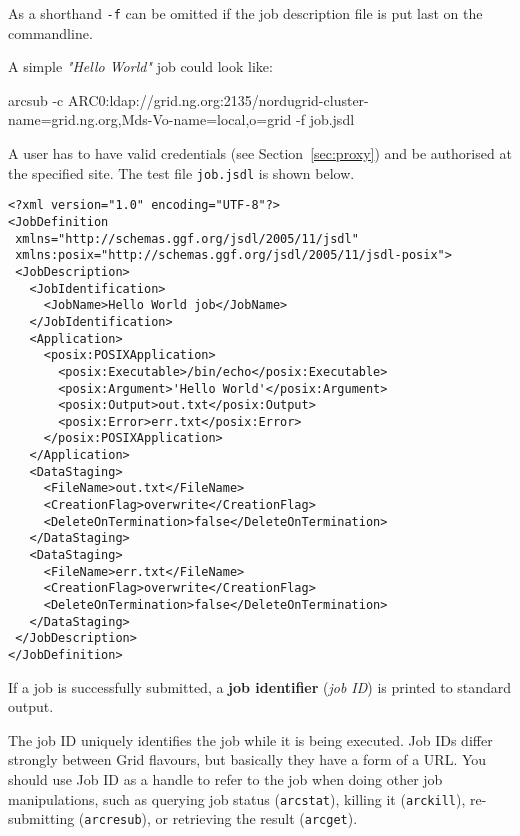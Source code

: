 As a shorthand \texttt{-f} can be omitted if the job description file is put last on the commandline.

A simple \textit{"Hello World"} job could look like:

\begin{shaded}
 arcsub -c ARC0:ldap://grid.ng.org:2135/nordugrid-cluster-name=grid.ng.org,Mds-Vo-name=local,o=grid -f job.jsdl
\end{shaded}

A user has to have valid credentials (see Section~\ref{sec:proxy}) and be authorised at the specified site. The test file \texttt{job.jsdl} is shown below.

\begin{framed}
\begin{verbatim}
<?xml version="1.0" encoding="UTF-8"?>
<JobDefinition
 xmlns="http://schemas.ggf.org/jsdl/2005/11/jsdl"
 xmlns:posix="http://schemas.ggf.org/jsdl/2005/11/jsdl-posix">
 <JobDescription>
   <JobIdentification>
     <JobName>Hello World job</JobName>
   </JobIdentification>
   <Application>
     <posix:POSIXApplication>
       <posix:Executable>/bin/echo</posix:Executable>
       <posix:Argument>'Hello World'</posix:Argument>
       <posix:Output>out.txt</posix:Output>
       <posix:Error>err.txt</posix:Error>
     </posix:POSIXApplication>
   </Application>
   <DataStaging>
     <FileName>out.txt</FileName>
     <CreationFlag>overwrite</CreationFlag>
     <DeleteOnTermination>false</DeleteOnTermination>
   </DataStaging>
   <DataStaging>
     <FileName>err.txt</FileName>
     <CreationFlag>overwrite</CreationFlag>
     <DeleteOnTermination>false</DeleteOnTermination>
   </DataStaging>
 </JobDescription>
</JobDefinition>
\end{verbatim}
\end{framed}

\begin{framed}
   If a job is successfully submitted, a \textbf{job identifier}
   (\textit{job ID}) is printed to standard output.
\end{framed}

The job ID uniquely identifies the job while it is being executed. Job IDs
differ strongly between Grid flavours, but basically they have a form of a URL.
You should use Job ID as a handle to refer to the job when doing other
job manipulations, such as querying job status (\verb#arcstat#),
killing it (\verb#arckill#), re-submitting (\verb#arcresub#), or
retrieving the result (\verb#arcget#).

